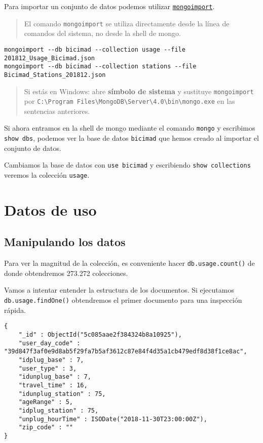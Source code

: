 \documentclass[]{article}
\begin{document}
Para importar un conjunto de datos podemos utilizar
\href{https://docs.mongodb.com/manual/reference/program/mongoimport/index.html}{\texttt{mongoimport}}.

\begin{quote}
El comando \texttt{mongoimport} se utiliza directamente desde la línea
de comandos del sistema, no desde la shell de mongo.
\end{quote}

\begin{verbatim}
mongoimport --db bicimad --collection usage --file 201812_Usage_Bicimad.json
mongoimport --db bicimad --collection stations --file Bicimad_Stations_201812.json
\end{verbatim}

\begin{quote}
Si estás en Windows: abre \textbf{símbolo de sistema} y sustituye
\texttt{mongoimport} por
\texttt{C:\textbackslash{}Program\ Files\textbackslash{}MongoDB\textbackslash{}Server\textbackslash{}4.0\textbackslash{}bin\textbackslash{}mongo.exe}
en las sentencias anteriores.
\end{quote}

Si ahora entramos en la shell de mongo mediante el comando
\texttt{mongo} y escribimos \texttt{show\ dbs}, podemos ver la base de
datos \texttt{bicimad} que hemos creado al importar el conjunto de
datos.

Cambiamos la base de datos con \texttt{use\ bicimad} y escribiendo
\texttt{show\ collections} veremos la colección \texttt{usage}.

\hypertarget{datos-de-uso}{%
\section{Datos de uso}\label{datos-de-uso}}

\hypertarget{manipulando-los-datos}{%
\subsection{Manipulando los datos}\label{manipulando-los-datos}}

Para ver la magnitud de la colección, es conveniente hacer
\texttt{db.usage.count()} de donde obtendremos 273.272 colecciones.

Vamos a intentar entender la estructura de los documentos. Si ejecutamos
\texttt{db.usage.findOne()} obtendremos el primer documento para una
inspección rápida.

\begin{verbatim}
{
    "_id" : ObjectId("5c085aae2f384324b8a10925"),
    "user_day_code" : "39d847f3af0e9d8ab5f29fa7b5af3612c87e84f4d35a1cb479edf8d38f1ce8ac",
    "idplug_base" : 7,
    "user_type" : 3,
    "idunplug_base" : 7,
    "travel_time" : 16,
    "idunplug_station" : 75,
    "ageRange" : 5,
    "idplug_station" : 75,
    "unplug_hourTime" : ISODate("2018-11-30T23:00:00Z"),
    "zip_code" : ""
}
\end{verbatim}
\end{document}
